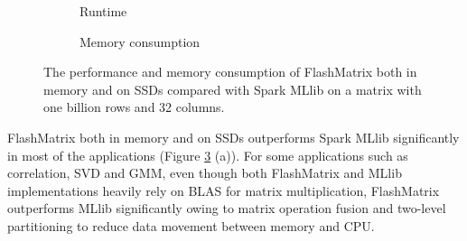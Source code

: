 \begin{figure}
	\centering
	\footnotesize
	\vspace{-15pt}
	\begin{subfigure}{.5\textwidth}
		
		\label{perf:rt}
		\vspace{-15pt}
		\caption{Runtime}
	\end{subfigure}

	\begin{subfigure}{.5\textwidth}
		
		\label{perf:mem}
		\vspace{-15pt}
		\caption{Memory consumption}
	\end{subfigure}
	\caption{The performance and memory consumption of FlashMatrix both
		in memory and on SSDs compared with Spark MLlib on a matrix with
	one billion rows and 32 columns.}
	\label{perf:fm}
\end{figure}

%		

FlashMatrix both in memory and on SSDs outperforms Spark MLlib significantly
in most of the applications (Figure \ref{perf:fm} (a)). For some applications
such as correlation, SVD and GMM,
even though both FlashMatrix and MLlib implementations heavily rely on BLAS
for matrix multiplication, FlashMatrix outperforms MLlib significantly
owing to matrix operation fusion and two-level partitioning to reduce data
movement between memory and CPU. %

%		

